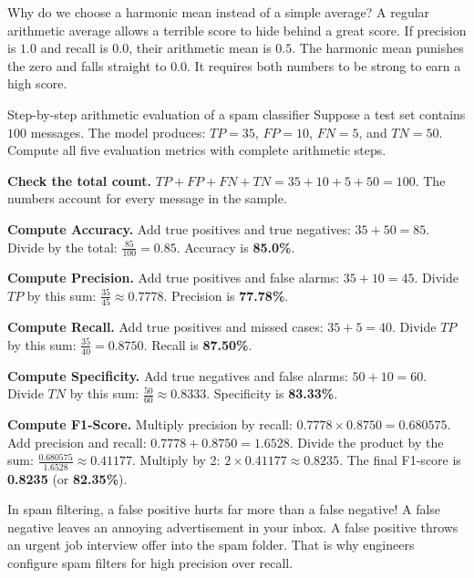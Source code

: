 \documentclass[a4paper,11pt]{article}
\begin{document}
\begin{intuition}
Why do we choose a harmonic mean instead of a simple average?
A regular arithmetic average allows a terrible score to hide behind a great score.
If precision is $1.0$ and recall is $0.0$, their arithmetic mean is $0.5$.
The harmonic mean punishes the zero and falls straight to $0.0$.
It requires both numbers to be strong to earn a high score.
\end{intuition}

\begin{worked}{Step-by-step arithmetic evaluation of a spam classifier}
Suppose a test set contains $100$ messages.
The model produces: $TP = 35$, $FP = 10$, $FN = 5$, and $TN = 50$.
Compute all five evaluation metrics with complete arithmetic steps.
\begin{steps}
  \item \textbf{Check the total count.}
        $TP + FP + FN + TN = 35 + 10 + 5 + 50 = 100$.
        The numbers account for every message in the sample.
  \item \textbf{Compute Accuracy.}
        Add true positives and true negatives: $35 + 50 = 85$.
        Divide by the total: $\frac{85}{100} = 0.85$.
        Accuracy is \textbf{85.0\%}.
  \item \textbf{Compute Precision.}
        Add true positives and false alarms: $35 + 10 = 45$.
        Divide $TP$ by this sum: $\frac{35}{45} \approx 0.7778$.
        Precision is \textbf{77.78\%}.
  \item \textbf{Compute Recall.}
        Add true positives and missed cases: $35 + 5 = 40$.
        Divide $TP$ by this sum: $\frac{35}{40} = 0.8750$.
        Recall is \textbf{87.50\%}.
  \item \textbf{Compute Specificity.}
        Add true negatives and false alarms: $50 + 10 = 60$.
        Divide $TN$ by this sum: $\frac{50}{60} \approx 0.8333$.
        Specificity is \textbf{83.33\%}.
  \item \textbf{Compute F1-Score.}
        Multiply precision by recall: $0.7778 \times 0.8750 = 0.680575$.
        Add precision and recall: $0.7778 + 0.8750 = 1.6528$.
        Divide the product by the sum: $\frac{0.680575}{1.6528} \approx 0.41177$.
        Multiply by 2: $2 \times 0.41177 \approx 0.8235$.
        The final F1-score is \textbf{0.8235} (or \textbf{82.35\%}).
\end{steps}
\end{worked}

\begin{waitwhat}
In spam filtering, a false positive hurts far more than a false negative!
A false negative leaves an annoying advertisement in your inbox.
A false positive throws an urgent job interview offer into the spam folder.
That is why engineers configure spam filters for high precision over recall.
\end{waitwhat}
\end{document}
